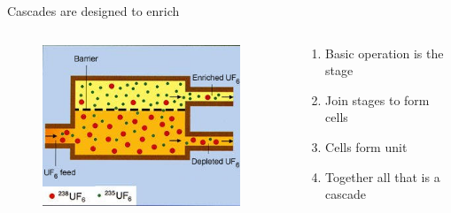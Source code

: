 \documentclass[aspectratio=1610,pdftex,dvipsnames,compress,xcolor={dvipsnames}]{beamer}
\begin{document}
\begin{frame}{Cascades are designed to enrich}
    \begin{columns}

        \begin{column}{0.45\textwidth}
            \begin{figure}
                \centering
                \includegraphics[width=0.95\textwidth]{enrichment.stage.jpg}
            \end{figure}
        \end{column}

        \begin{column}{0.55\textwidth}
            \begin{enumerate}[series=outerlist,topsep=0pt,itemsep=21pt,leftmargin=*,label=(\arabic*)]
                \item[]Basic operation is the stage
                \item[]Join stages to form cells
                \item[]Cells form unit
                \item[]Together all that is a cascade
            \end{enumerate}
        \end{column}

    \end{columns}
\end{frame}
\end{document}
